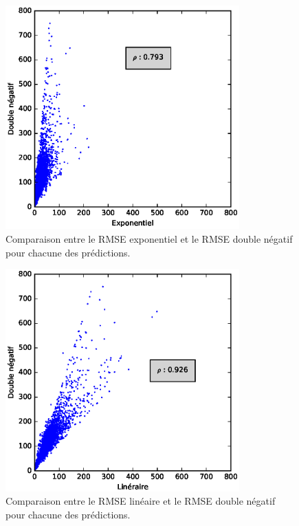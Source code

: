 \documentclass[letterpaper]{article}
\begin{document}
\begin{appendices}
\begin{figure}[h]
   \centerline{\includegraphics[width=9cm]{metrics-exp-double.eps}}
   \caption{Comparaison entre le RMSE exponentiel et le RMSE double négatif pour chacune des prédictions.}
\end{figure}

\begin{figure}[h]
   \centerline{\includegraphics[width=9cm]{metrics-lin-double.eps}}
   \caption{Comparaison entre le RMSE linéaire et le RMSE double négatif pour chacune des prédictions.}
\end{figure}


\end{appendices}
\end{document}
